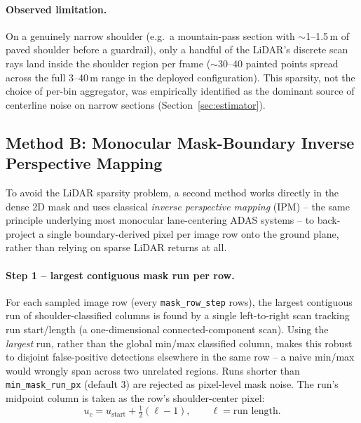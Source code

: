 \documentclass[11pt]{article}
\newcommand{\code}[1]{\texttt{#1}}
\begin{document}
\paragraph{Observed limitation.} On a genuinely narrow shoulder (e.g.\ a mountain-pass section
with $\sim$1--1.5\,m of paved shoulder before a guardrail), only a handful of the LiDAR's discrete
scan rays land inside the shoulder region per frame ($\sim$30--40 painted points spread across the
full 3--40\,m range in the deployed configuration). This sparsity, not the choice of per-bin
aggregator, was empirically identified as the dominant source of centerline noise on narrow
sections (Section~\ref{sec:estimator}).

\subsection{Method B: Monocular Mask-Boundary Inverse Perspective Mapping}
\label{sec:ipm}

To avoid the LiDAR sparsity problem, a second method works directly in the dense 2D mask and uses
classical \emph{inverse perspective mapping} (IPM) \citep{ipm2021,ipm2026} -- the same principle
underlying most monocular lane-centering ADAS systems -- to back-project a single boundary-derived
pixel per image row onto the ground plane, rather than relying on sparse LiDAR returns at all.

\paragraph{Step 1 -- largest contiguous mask run per row.} For each sampled image row
(every \code{mask\_row\_step} rows), the largest contiguous run of shoulder-classified columns is
found by a single left-to-right scan tracking run start/length (a one-dimensional connected-component
scan). Using the \emph{largest} run, rather than the global min/max classified column, makes this
robust to disjoint false-positive detections elsewhere in the same row -- a naive min/max would
wrongly span across two unrelated regions. Runs shorter than \code{min\_mask\_run\_px} (default 3)
are rejected as pixel-level mask noise. The run's midpoint column is taken as the row's
shoulder-center pixel:
\begin{equation}
u_c = u_{\text{start}} + \tfrac{1}{2}(\ell - 1), \qquad \ell = \text{run length}.
\end{equation}
\end{document}
